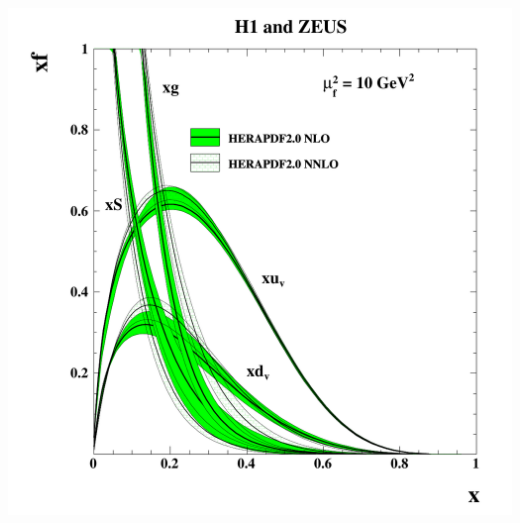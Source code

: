 \documentclass[10pt,t]{beamer}
\begin{document}
\begin{frame}
\begin{columns}
    \includegraphics[width=\textwidth,trim={2.4cm 1.7cm 1.1cm 0.4cm},clip]{hera-pdf}
\end{columns}
\vspace*{-7pt}
\end{frame}
\end{document}
